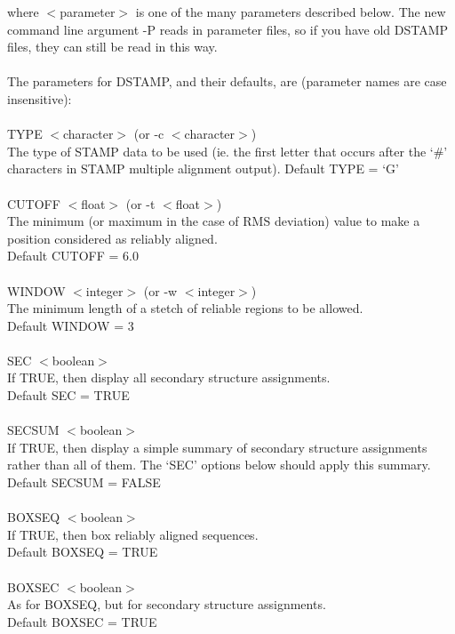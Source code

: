where $<$parameter$>$ is one of the many parameters described below.
The new command line argument -P reads in parameter files, so if 
you have old DSTAMP files, they can still be read in this way. \\
\\
The parameters for DSTAMP, and their defaults, are (parameter names
are case insensitive):\\
\\
TYPE       $<$character$>$ (or -c $<$character$>$)  \\
The type of STAMP data to be used (ie. the first letter that 
occurs after the `\#' characters in STAMP multiple alignment
output).
Default TYPE = `G'\\
\\
CUTOFF     $<$float$>$ (or -t $<$float$>$) \\
The minimum (or maximum in the case of RMS deviation) value to make
a position considered as reliably aligned.\\
Default CUTOFF = 6.0\\
\\
WINDOW     $<$integer$>$ (or -w $<$integer$>$)\\
The minimum length of a stetch of reliable regions to be allowed.\\
Default WINDOW = 3\\
\\
SEC $<$boolean$>$\\
If TRUE, then display all secondary structure assignments.\\
Default SEC = TRUE\\
\\
SECSUM $<$boolean$>$\\
If TRUE, then display a simple summary of secondary structure
assignments rather than all of them.  The `SEC' options below
should apply this summary.\\
Default SECSUM = FALSE\\
\\
BOXSEQ     $<$boolean$>$\\
If TRUE, then box reliably aligned sequences.\\
Default BOXSEQ = TRUE\\
\\
BOXSEC              $<$boolean$>$\\
As for BOXSEQ, but for secondary structure assignments.\\
Default BOXSEC = TRUE\\
\\
